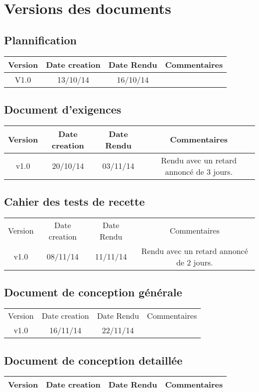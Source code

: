 \documentclass[fleqn, a4paper]{report}
\begin{document}
  \chapter*{Versions des documents}
  
  \section*{Plannification}
    \begin{tabular}{|c|c|c|c|}
      \hline
      Version & Date creation & Date Rendu & Commentaires\\
      \hline
      V1.0 & 13/10/14 & 16/10/14 & \\
      \hline
    \end{tabular}
    
   \section*{Document d'exigences}
    \begin{tabular}{|c|c|c|c|}
      \hline
      Version & Date creation & Date Rendu & Commentaires\\
      \hline
      v1.0 & 20/10/14 & 03/11/14 & Rendu avec un retard annoncé de 3 jours.
    \end{tabular}
    
   \section*{Cahier des tests de recette}
    \begin{tabular}{|c|c|c|c|}
      \hline
      Version & Date creation & Date Rendu & Commentaires\\
      v1.0 & 08/11/14 & 11/11/14 & Rendu avec un retard annoncé de 2 jours.
      \hline
    \end{tabular}  
    
   \section*{Document de conception générale}
    \begin{tabular}{|c|c|c|c|}
      \hline
      Version & Date creation & Date Rendu & Commentaires\\
      v1.0 & 16/11/14 & 22/11/14 & \\
      \hline
    \end{tabular}   
    
   \section*{Document de conception detaillée}
    \begin{tabular}{|c|c|c|c|}
      \hline
      Version & Date creation & Date Rendu & Commentaires\\
      \hline
    \end{tabular}
    
\end{document}
